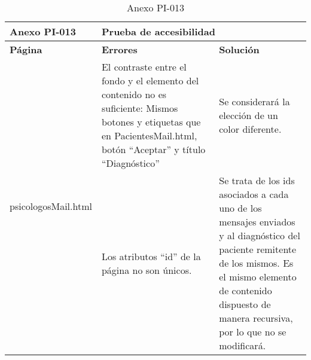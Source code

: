 \begin{table}[htpb]
\centering
\begin{tabularx}{\textwidth}{|l|X|X|}
\hline
\rowcolor[gray]{0.9}\textbf{Anexo PI-013} & \multicolumn{2}{l|}{\textbf{Prueba de accesibilidad}}                                                                                                                                                                                                                                                                                                                                     \\ \hline
\textbf{Página}       & \textbf{Errores}                                                                                                                                                 & \textbf{Solución}                                                                                                                                                                                                      \\ \hline
\multirow{2}{*}{psicologosMail.html}   & El contraste entre el fondo y el elemento del contenido no es suficiente: Mismos botones y etiquetas que en PacientesMail.html, botón “Aceptar” y título “Diagnóstico” & Se considerará la elección de un color diferente.                                                                                                                                                                      \\ \cline{2-3} 
                      & Los atributos “id” de la página no son únicos.                                                                                                                   & Se trata de los ids asociados a cada uno de los mensajes enviados y al diagnóstico del paciente remitente de los mismos. Es el mismo elemento de contenido dispuesto de manera recursiva, por lo que no se modificará. \\ \hline
\end{tabularx}
\caption{Anexo PI-013}
\end{table}


